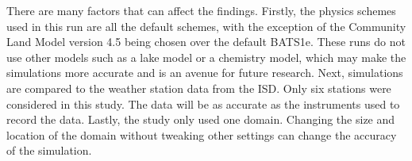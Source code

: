 		There are many factors that can affect the findings. 
		Firstly, the physics schemes used in this run are all the default schemes, with the exception of the Community Land Model version 4.5 being chosen over the default BATS1e. 
		These runs do not use other models such as a lake model or a chemistry model, which may make the simulations more accurate and is an avenue for future research.
		Next, simulations are compared to the weather station data from the ISD.
		Only six stations were considered in this study.
		The data will be as accurate as the instruments used to record the data.
		Lastly, the study only used one domain.
		Changing the size and location of the domain without tweaking other settings can change the accuracy of the simulation.
		
		
		
		
		
		